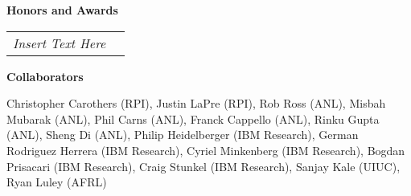 \documentclass[times,11pt]{article}    %
\begin{document}
\vskip 6pt
\textbf{\sffamily Honors and Awards}
\vskip 6pt

\begin{tabular}{ll}
{\em Insert Text Here}
\end{tabular}
\vskip 6pt

\textbf{\sffamily Collaborators}

Christopher Carothers (RPI), Justin LaPre (RPI),
Rob Ross (ANL), Misbah Mubarak (ANL), Phil Carns (ANL),
Franck Cappello (ANL), Rinku Gupta (ANL), Sheng Di (ANL),
Philip Heidelberger (IBM Research), German Rodriguez Herrera (IBM Research), Cyriel Minkenberg (IBM Research), Bogdan Prisacari (IBM Research), Craig Stunkel (IBM Research),
Sanjay Kale (UIUC),
Ryan Luley (AFRL)

\end{document}
